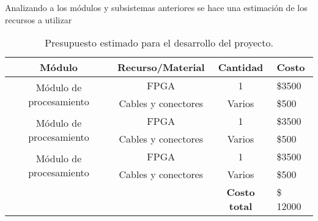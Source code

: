 Analizando a los módulos y subsistemas anteriores se hace una estimación de los recursos a utilizar
\begin{table}[!ht]
	\centering
	\caption{Presupuesto estimado para el desarrollo del proyecto.}
	\begin{tabular}{cccl}
		\toprule
		            \textbf{Módulo}              & \textbf{Recurso/Material} &  \textbf{Cantidad}   & \textbf{Costo} \\ \midrule
		\multirow{2}{*}{Módulo de procesamiento} &           FPGA            &          1           & \$3500         \\
		                                         &    Cables y conectores    &        Varios        & \$500          \\ \midrule
		\multirow{2}{*}{Módulo de procesamiento} &           FPGA            &          1           & \$3500         \\
		                                         &    Cables y conectores    &        Varios        & \$500          \\ \midrule
		\multirow{2}{*}{Módulo de procesamiento} &           FPGA            &          1           & \$3500         \\
		                                         &    Cables y conectores    &        Varios        & \$500          \\ \midrule
		                                         &                           & \textbf{Costo total} & \$ 12000       \\ \bottomrule
	\end{tabular}
\end{table}


